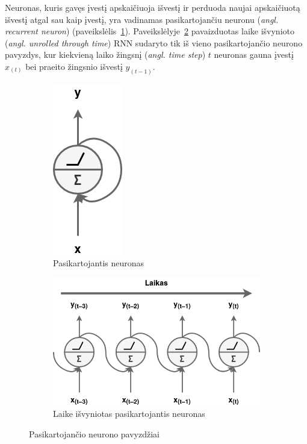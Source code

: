 \documentclass{VUMIFPSbakalaurinis}
\begin{document}
{
	Neuronas, kuris gavęs įvestį apskaičiuoja išvestį ir perduoda naujai apskaičiuotą išvestį atgal sau kaip įvestį, yra vadinamas pasikartojančiu neuronu (\textit{angl. recurrent neuron}) (paveikslėlis~\ref{img:recurrent_neuron}). Paveikslėlyje~\ref{img:unrolled} pavaizduotas laike išvynioto (\textit{angl. unrolled through time}) RNN sudaryto tik iš vieno pasikartojančio neurono pavyzdys, kur kiekvieną laiko žingsnį (\textit{angl. time step}) \(t\) neuronas gauna įvestį \(x_{(t)}\) bei praeito žingsnio išvestį \(y_{(t-1)}\).
	
	\begin{figure}[H]
		\centering
		\begin{subfigure}[b]{.33\textwidth}
			\centering
			\includegraphics[scale=0.33]{img/recurrent_neuron}
			\caption{Pasikartojantis neuronas}
			\label{img:recurrent_neuron}
		\end{subfigure}%
		\begin{subfigure}[b]{.66\textwidth}
			\centering
			\includegraphics[scale=0.33]{img/unrolled}
			\caption{Laike išvyniotas pasikartojantis neuronas}
			\label{img:unrolled}
		\end{subfigure}
		\caption{Pasikartojančio neurono pavyzdžiai}
		\label{img:rnn_simple}
	\end{figure} 

}
\end{document}
